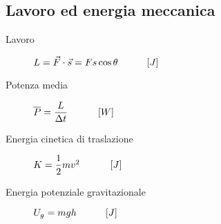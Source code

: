 \documentclass[a4paper,11pt,italian]{article}
\begin{document}
\subsection{Lavoro ed energia meccanica}

\begin{description}
  \item[Lavoro] 
%   
  $ L = \vec{F} \cdot \vec{s} = F s \cos\theta \hspace*{3em} [J]  $
%   
  
  \item[Potenza media] 
  $ \overline{P} = \dfrac{L}{\Delta t} \hspace*{3em} \left[ W \right] $
  
  \item[Energia cinetica di traslazione] 
  $ K = \dfrac{1}{2} mv^2 \hspace*{3em} \left[ J \right]$
  
  \item[Energia potenziale gravitazionale] 
%   
  $ U_g = mgh \hspace*{3em} [J] $
%   
  

\end{description}
\end{document}
